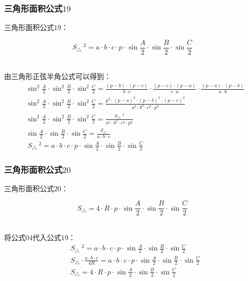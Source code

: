 \documentclass[UTF8]{ctexart}
\begin{document}
\subsubsection{三角形面积公式$19$}
    三角形面积公式$19$：
    \begin{large}
        \begin{equation*}
            S_{\triangle}~^2=a\cdot b\cdot c\cdot p\cdot\sin{\frac{A}{2}}\cdot\sin{\frac{B}{2}}\cdot\sin{\frac{C}{2}}
        \end{equation*}
    \end{large}\\
    由三角形正弦半角公式可以得到：\vspace{5pt}
    \setcounter{equation}{0}
    \begin{align}
        &\sin^2{\frac{A}{2}}\cdot\sin^2{\frac{B}{2}}\cdot\sin^2{\frac{C}{2}}=\frac{(p-b)\cdot(p-c)}{b\cdot c}\cdot\frac{(p-c)\cdot(p-a)}{c\cdot a}\cdot\frac{(p-a)\cdot(p-b)}{a\cdot b}\\[3mm]
        &\sin^2{\frac{A}{2}}\cdot\sin^2{\frac{B}{2}}\cdot\sin^2{\frac{C}{2}}=\frac{p^2\cdot(p-a)^2\cdot(p-b)^2\cdot(p-c)^2}{a^2\cdot b^2\cdot c^2\cdot p^2}\\[3mm]
        &\sin^2{\frac{A}{2}}\cdot\sin^2{\frac{B}{2}}\cdot\sin^2{\frac{C}{2}}=\frac{S_{\triangle}~^4}{a^2\cdot b^2\cdot c^2\cdot p^2}\\[3mm]
        &\sin{\frac{A}{2}}\cdot\sin{\frac{B}{2}}\cdot\sin{\frac{C}{2}}=\frac{S_{\triangle}}{a\cdot b\cdot c}\\[3mm]
        &~S_{\triangle}~^2=a\cdot b\cdot c\cdot p\cdot\sin{\frac{A}{2}}\cdot\sin{\frac{B}{2}}\cdot\sin{\frac{C}{2}}
    \end{align}

\newpage

\subsubsection{三角形面积公式$20$}
    三角形面积公式$20$：
    \begin{large}
        \begin{equation*}
            S_{\triangle}=4\cdot R\cdot p\cdot\sin{\frac{A}{2}}\cdot\sin{\frac{B}{2}}\cdot\sin{\frac{C}{2}}
        \end{equation*}
    \end{large}\\
    将公式$04$代入公式$19$：
    \setcounter{equation}{0}
    \begin{align}
        &S_{\triangle}~^2=a\cdot b\cdot c\cdot p\cdot\sin{\frac{A}{2}}\cdot\sin{\frac{B}{2}}\cdot\sin{\frac{C}{2}}\\[3mm]
        &S_{\triangle}\cdot\frac{a\cdot b\cdot c}{4R}=a\cdot b\cdot c\cdot p\cdot\sin{\frac{A}{2}}\cdot\sin{\frac{B}{2}}\cdot\sin{\frac{C}{2}}\\[3mm]
        &S_{\triangle}=4\cdot R\cdot p\cdot\sin{\frac{A}{2}}\cdot\sin{\frac{B}{2}}\cdot\sin{\frac{C}{2}}
    \end{align}\\
\end{document}
